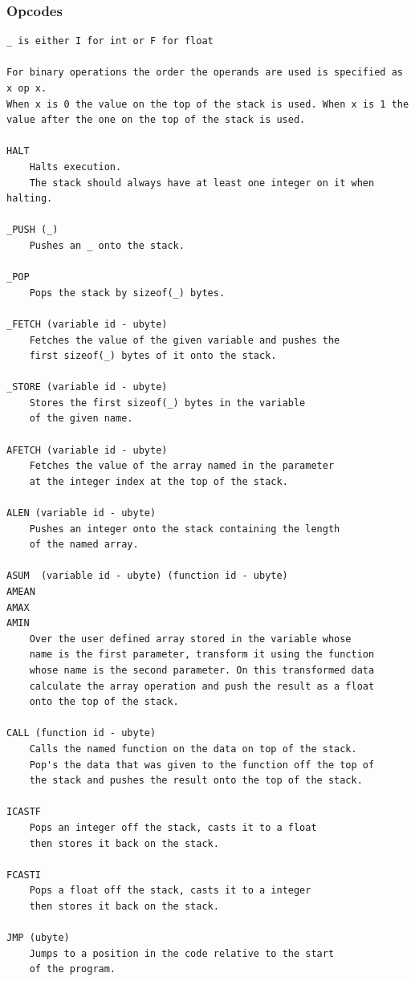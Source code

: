 \subsubsection{Opcodes}

\begin{verbatim}
_ is either I for int or F for float

For binary operations the order the operands are used is specified as x op x.
When x is 0 the value on the top of the stack is used. When x is 1 the
value after the one on the top of the stack is used.

HALT
    Halts execution.
    The stack should always have at least one integer on it when halting.

_PUSH (_)
    Pushes an _ onto the stack.

_POP
    Pops the stack by sizeof(_) bytes.

_FETCH (variable id - ubyte)
    Fetches the value of the given variable and pushes the
    first sizeof(_) bytes of it onto the stack.

_STORE (variable id - ubyte)
    Stores the first sizeof(_) bytes in the variable
    of the given name.

AFETCH (variable id - ubyte)
    Fetches the value of the array named in the parameter
    at the integer index at the top of the stack.

ALEN (variable id - ubyte)
    Pushes an integer onto the stack containing the length
    of the named array.
	
ASUM  (variable id - ubyte) (function id - ubyte)
AMEAN
AMAX
AMIN
    Over the user defined array stored in the variable whose
    name is the first parameter, transform it using the function
    whose name is the second parameter. On this transformed data
    calculate the array operation and push the result as a float
    onto the top of the stack.

CALL (function id - ubyte)
    Calls the named function on the data on top of the stack.
    Pop's the data that was given to the function off the top of
    the stack and pushes the result onto the top of the stack.

ICASTF
    Pops an integer off the stack, casts it to a float
    then stores it back on the stack.

FCASTI
    Pops a float off the stack, casts it to a integer
    then stores it back on the stack.

JMP (ubyte)
    Jumps to a position in the code relative to the start
    of the program.


\end{verbatim}
